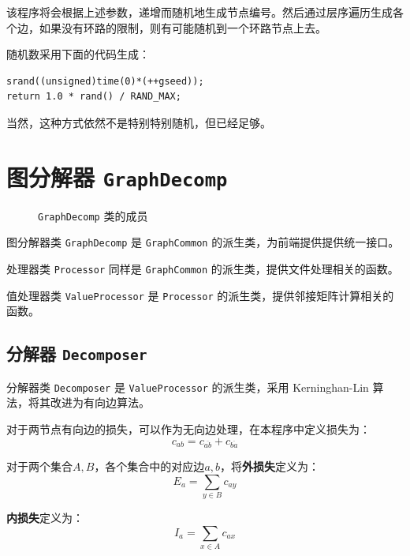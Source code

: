 \documentclass[a4paper,12pt]{article}
\begin{document}
\begin{CJK}{UTF8}{song}
该程序将会根据上述参数，递增而随机地生成节点编号。然后通过层序遍历生成各个边，如果没有环路的限制，则有可能随机到一个环路节点上去。

随机数采用下面的代码生成：

\begin{lstlisting}
srand((unsigned)time(0)*(++gseed));
return 1.0 * rand() / RAND_MAX;	
\end{lstlisting}

当然，这种方式依然不是特别特别随机，但已经足够。

\section{图分解器 \texttt{GraphDecomp}}

\begin{figure}[H]
    \centering
    
    \caption{\texttt{GraphDecomp} 类的成员}
\end{figure}

图分解器类 \texttt{GraphDecomp} 是 \texttt{GraphCommon}
的派生类，为前端提供提供统一接口。

处理器类 \texttt{Processor} 同样是 \texttt{GraphCommon}
的派生类，提供文件处理相关的函数。

值处理器类 \texttt{ValueProcessor} 是 \texttt{Processor}
的派生类，提供邻接矩阵计算相关的函数。

\hypertarget{header-n135}{%
\subsection{\texorpdfstring{分解器
\texttt{Decomposer}}{分解器 Decomposer}}\label{header-n135}}

分解器类 \texttt{Decomposer} 是 \texttt{ValueProcessor} 的派生类，采用
Kerninghan-Lin
算法\cite{kl}，将其改进为有向边算法。

对于两节点有向边的损失，可以作为无向边处理，在本程序中定义损失为：
\begin{equation}
    c_{ab} = c_{\overline{ab}}+c_{\overline{ba}}
\end{equation}

对于两个集合$A,B$，各个集合中的对应边$a,b$，将\textbf{外损失}定义为：\begin{equation}
    E_a=\sum_{y \in B}c_{ay}
\end{equation}

\textbf{内损失}定义为：
\begin{equation}
    I_a=\sum_{x \in A}c_{ax}
\end{equation}


\end{CJK}
\end{document}
